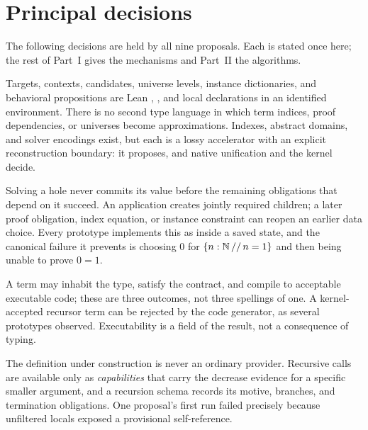 \section{Principal decisions}\label{sec:decisions}

The following decisions are held by all nine proposals. Each is stated once here; the rest of Part~I gives the mechanisms and Part~II the algorithms.

\begin{decision}\label{dec:exact}
Targets, contexts, candidates, universe levels, instance dictionaries, and behavioral propositions are Lean , , and local declarations in an identified environment. There is no second type language in which term indices, proof dependencies, or universes become approximations. Indexes, abstract domains, and solver encodings exist, but each is a lossy accelerator with an explicit reconstruction boundary: it proposes, and native unification and the kernel decide.
\end{decision}

\begin{decision}\label{dec:continuation}
Solving a hole never commits its value before the remaining obligations that depend on it succeed. An application creates jointly required children; a later proof obligation, index equation, or instance constraint can reopen an earlier data choice. Every prototype implements this as  inside a saved state, and the canonical failure it prevents is choosing $0$ for $\{n : \mathbb{N} \,//\, n = 1\}$ and then being unable to prove $0 = 1$.
\end{decision}

\begin{decision}\label{dec:three}
A term may inhabit the type, satisfy the contract, and compile to acceptable executable code; these are three outcomes, not three spellings of one. A kernel-accepted recursor term can be rejected by the code generator, as several prototypes observed. Executability is a field of the result, not a consequence of typing.
\end{decision}

\begin{decision}\label{dec:recursion}
The definition under construction is never an ordinary provider. Recursive calls are available only as \emph{capabilities} that carry the decrease evidence for a specific smaller argument, and a recursion schema records its motive, branches, and termination obligations. One proposal's first run failed precisely because unfiltered locals exposed a provisional self-reference.
\end{decision}

